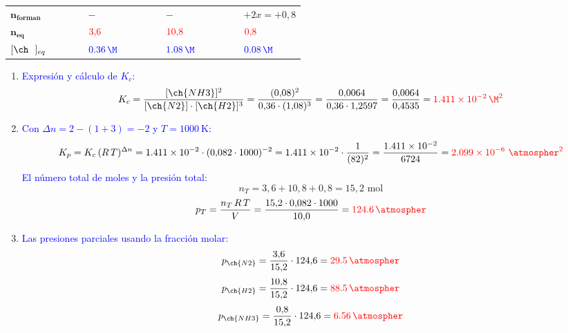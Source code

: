 \begin{exerciseEVAU}
\begin{solu}
\begin{table}[H]
\begin{tabular}{@{}C{0.21\linewidth} @{\,}c@{\,} C{0.21\linewidth} @{\,}c@{\,} C{0.21\linewidth} @{\,}c@{\,} C{0.21\linewidth}@{}}
                \(\bm{n_{\text{forman}}}\) &  & \(-\) &  & \(-\) &  & \(+2x = +0{,}8\) \\[3pt]
                \(\bm{n_{\text{eq}}}\) &  & \({\color{red}3{,}6}\) &  & \({\color{red}10{,}8}\) &  & \({\color{red}0{,}8}\) \\[3pt]
                \(\conc{\ \ }_{eq}\) &  & \({\color{blue}\qty{0{,}36}{\M}}\) &  & \({\color{blue}\qty{1{,}08}{\M}}\) &  & \({\color{blue}\qty{0{,}08}{\M}}\) \\
                \bottomrule
            \end{tabular}
        \end{table}

    \begin{enumerate}[label=\letraminuscula]
        \item \textcolor{blue}{Expresión y cálculo de \(K_c\):}
        \[
            K_c = \frac{[\ch{NH3}]^2}{[\ch{N2}]\cdot[\ch{H2}]^3} = \frac{(0{,}08)^2}{0{,}36\cdot(1{,}08)^3} = \frac{0{,}0064}{0{,}36\cdot1{,}2597} = \frac{0{,}0064}{0{,}4535} = \textcolor{red}{\qty{1{,}411e-2}{\per\square\M}}
        \]

        \item \textcolor{blue}{Con \(\Delta n = 2 - (1+3) = -2\) y \(T = \qty{1000}{\K}\):}
        \[
            K_p = K_c\,(R\,T)^{\Delta n} = \num{1{,}411e-2}\cdot(0{,}082\cdot1000)^{-2} = \num{1{,}411e-2}\cdot\frac{1}{(82)^2} = \frac{\num{1{,}411e-2}}{6724} = \textcolor{red}{\num{2{,}099e-6}\ \unit{\per\square\atmospher}}
        \]
        \textcolor{blue}{El número total de moles y la presión total:}
        \[
            n_T = 3{,}6 + 10{,}8 + 0{,}8 = 15{,}2 \text{ mol}
        \]
        \[
            p_T = \frac{n_T\,R\,T}{V} = \frac{15{,}2\cdot0{,}082\cdot1000}{10{,}0} = \textcolor{red}{\qty{124{,}6}{\atmospher}}
        \]

        \item \textcolor{blue}{Las presiones parciales usando la fracción molar:}
        \[
            p_{\ch{N2}} = \frac{3{,}6}{15{,}2}\cdot124{,}6 = \textcolor{red}{\qty{29{,}5}{\atmospher}}
        \]
        \[
            p_{\ch{H2}} = \frac{10{,}8}{15{,}2}\cdot124{,}6 = \textcolor{red}{\qty{88{,}5}{\atmospher}}
        \]
        \[
            p_{\ch{NH3}} = \frac{0{,}8}{15{,}2}\cdot124{,}6 = \textcolor{red}{\qty{6{,}56}{\atmospher}}
        \]
    \end{enumerate}

    \end{solu}
\end{exerciseEVAU}


